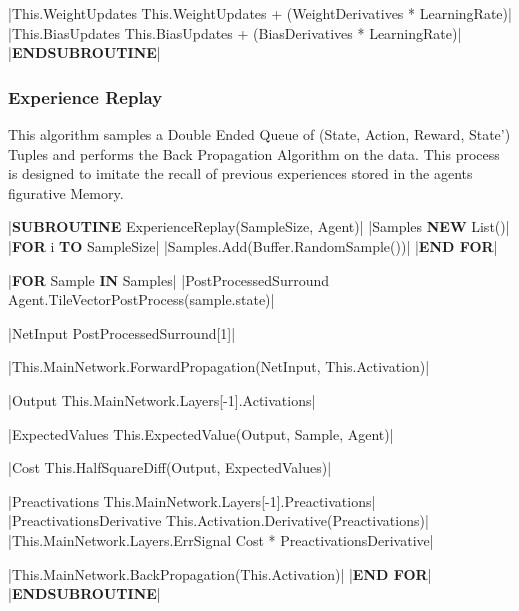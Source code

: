 \begin{flushleft}
\begin{pseudocode}
    |This.WeightUpdates \leftarrow This.WeightUpdates + (WeightDerivatives * LearningRate)|
    |This.BiasUpdates \leftarrow This.BiasUpdates + (BiasDerivatives * LearningRate)|
|\textbf{ENDSUBROUTINE}|
                \end{pseudocode}

                \vspace{0.5cm}
            \subsubsection{Experience Replay}
                This algorithm samples a Double Ended Queue of (State, Action, Reward, State') Tuples and performs the Back Propagation Algorithm
                on the data. This process is designed to imitate the recall of previous experiences stored in the agents figurative Memory.

                \vspace{0.2cm}
                \begin{pseudocode}
|\textbf{SUBROUTINE} ExperienceReplay(SampleSize, Agent)|
    |Samples \leftarrow \textbf{NEW} List()|
    |\textbf{FOR} i  \textbf{TO} SampleSize|
        |Samples.Add(Buffer.RandomSample())|
    |\textbf{END FOR}|

    |\textbf{FOR} Sample \textbf{IN} Samples|
        |PostProcessedSurround \leftarrow Agent.TileVectorPostProcess(sample.state)|

        |NetInput \leftarrow PostProcessedSurround[1]|

        |This.MainNetwork.ForwardPropagation(NetInput, This.Activation)|

        |Output \leftarrow This.MainNetwork.Layers[-1].Activations|

        |ExpectedValues \leftarrow This.ExpectedValue(Output, Sample, Agent)|

        |Cost \leftarrow This.HalfSquareDiff(Output, ExpectedValues)|

        |Preactivations \leftarrow This.MainNetwork.Layers[-1].Preactivations|
        |PreactivationsDerivative \leftarrow This.Activation.Derivative(Preactivations)|
        |This.MainNetwork.Layers.ErrSignal \leftarrow Cost * PreactivationsDerivative|

        |This.MainNetwork.BackPropagation(This.Activation)|
    |\textbf{END FOR}|
|\textbf{ENDSUBROUTINE}|
                \end{pseudocode}

                \vspace{0.5cm}

\end{flushleft}
